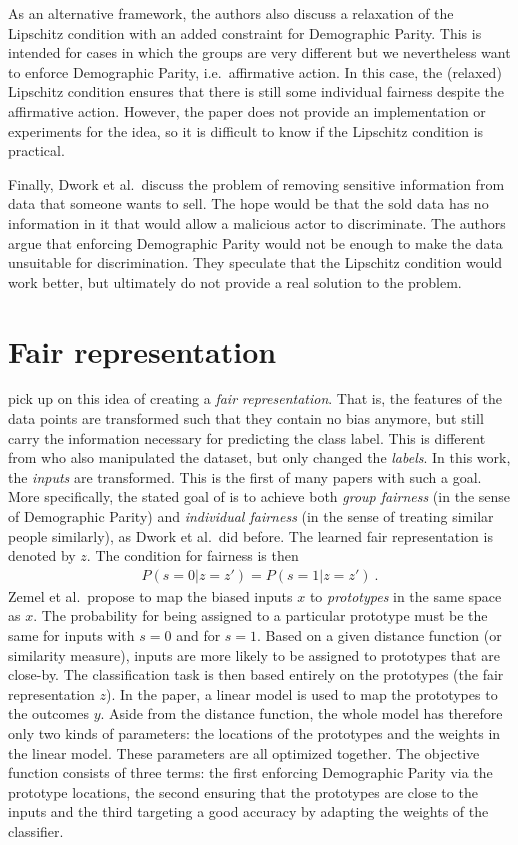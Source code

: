 As an alternative framework,
the authors also discuss a relaxation of the Lipschitz condition
with an added constraint for Demographic Parity.
This is intended for cases in which the groups are very different
but we nevertheless want to enforce Demographic Parity, i.e.~affirmative action.
In this case, the (relaxed) Lipschitz condition ensures
that there is still some individual fairness despite the affirmative action.
However, the paper does not provide an implementation or experiments for the idea,
so it is difficult to know if the Lipschitz condition is practical.

Finally, Dwork et al.~discuss the problem of removing sensitive information
from data that someone wants to sell.
The hope would be that the sold data has no information in it
that would allow a malicious actor to discriminate.
The authors argue that enforcing Demographic Parity would not be enough
to make the data unsuitable for discrimination.
They speculate that the Lipschitz condition would work better,
but ultimately do not provide a real solution to the problem.

\section{Fair representation}\label{fair-representation}
\citet{zemel2013learning} pick up on this idea of creating a \emph{fair representation}.
That is, the features of the data points are transformed such that they contain no bias anymore,
but still carry the information necessary for predicting the class label.
This is different from \citet{kamiran2009classifying} who also manipulated the dataset,
but only changed the \emph{labels}.
In this work, the \emph{inputs} are transformed.
This is the first of many papers with such a goal.
More specifically, the stated goal of \citet{zemel2013learning} is
to achieve both \emph{group fairness} (in the sense of Demographic Parity)
and \emph{individual fairness} (in the sense of treating similar people similarly),
as Dwork et al.~did before.
The learned fair representation is denoted by \(z\).
The condition for fairness is then
\begin{align}
  \label{eq:fair-representation}
  P(s=0|z=z') = P(s=1|z=z') ~.
\end{align}
Zemel et al.~propose to map the biased inputs \(x\) to \emph{prototypes} in the same space as \(x\).
The probability for being assigned to a particular prototype
must be the same for inputs with \(s=0\) and for \(s=1\).
Based on a given distance function (or similarity measure),
inputs are more likely to be assigned to prototypes that are close-by.
The classification task is then based entirely on the prototypes (the fair representation \(z\)).
In the paper, a linear model is used to map the prototypes to the outcomes \(y\).
Aside from the distance function, the whole model has therefore only two kinds of parameters:
the locations of the prototypes and the weights in the linear model.
These parameters are all optimized together.
The objective function consists of three terms:
the first enforcing Demographic Parity via the prototype locations,
the second ensuring that the prototypes are close to the inputs
and the third targeting a good accuracy by adapting the weights of the classifier.

